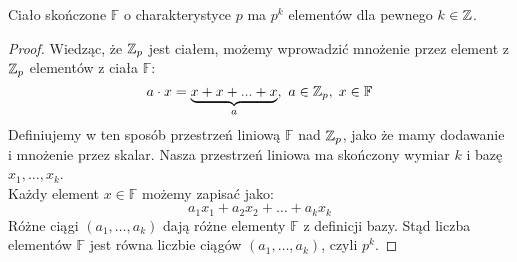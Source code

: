 

\begin{theorem}
Ciało skończone \( \mathbb{F} \)  o charakterystyce \( p \) ma \( p^k \) elementów dla pewnego \( k \in \mathbb{Z} \).
\end{theorem}
 \begin{proof}
    Wiedząc, że \( \mathbb{Z}_p \) jest ciałem, możemy wprowadzić mnożenie przez element z \( \mathbb{Z}_p \) elementów z ciała \( \mathbb{F} \):
    \[
        a \cdot x = \underbrace{x + x + ... + x}_a, \ a \in \mathbb{Z}_p,\; x \in \mathbb{F}
    \]
    Definiujemy w ten sposób przestrzeń liniową \( \mathbb{F} \) nad \( \mathbb{Z}_p \), jako że mamy dodawanie i mnożenie przez skalar. Nasza przestrzeń liniowa ma skończony wymiar \( k \) i bazę \( x_1, \dots, x_k \). \\
    Każdy element \( x \in \mathbb{F} \) możemy zapisać jako:
    \[
        a_1x_1 + a_2x_2 + \dots + a_kx_k
    \]
    Różne ciągi \( (a_1, \dots, a_k) \) dają różne elementy \( \mathbb{F} \) z definicji bazy. Stąd liczba elementów \( \mathbb{F} \) jest równa liczbie ciągów \( (a_1, \dots, a_k) \), czyli \( p^k \).
\end{proof}